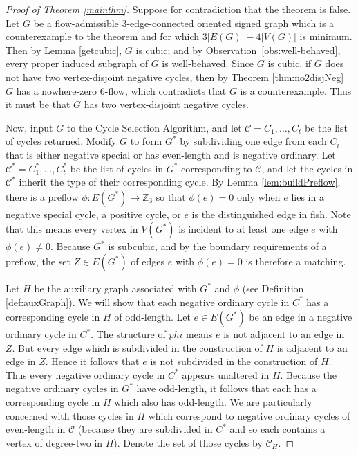 \documentclass[12pt]{article}
\begin{document}
\begin{proof}[Proof of Theorem \ref{mainthm}]
Suppose for contradiction that the theorem is false. Let $G$ be a flow-admissible 3-edge-connected oriented signed graph which is a counterexample to the theorem and for which $3|E(G)| - 4|V(G)|$ is minimum. Then by Lemma \ref{getcubic}, $G$ is cubic; and  
by Observation~\ref{obs:well-behaved}, every proper induced subgraph of $G$ is well-behaved. Since $G$ is cubic, if $G$ does not have two vertex-disjoint negative cycles, then by Theorem \ref{thm:no2disjNeg} $G$ has a nowhere-zero 6-flow, which contradicts that $G$ is a counterexample. Thus it must be that $G$ has two vertex-disjoint negative cycles. 

Now, input $G$ to the Cycle Selection Algorithm, and let $\mathcal{C} = C_1, \dots, C_t$ be the list of cycles returned.
Modify $G$ to form $G^*$ by subdividing one edge from each $C_i$ that is either negative special or has even-length and is negative ordinary. Let $\mathcal{C}^* = C_1^*, \ldots, C_t^*$ be the list of cycles in $G^*$ corresponding to $\mathcal{C}$, and let the cycles in $\mathcal{C}^*$ inherit the type of their corresponding cycle. By Lemma \ref{lem:buildPreflow}, there is a preflow $\phi : E(G^*) \rightarrow {\mathbb Z}_3$ so that $\phi(e) = 0$ only when $e$ lies in a negative special cycle, a positive cycle, or $e$ is the distinguished edge in fish. Note that this means every vertex in $V(G^*)$ is incident to at least one edge $e$ with $\phi(e) \neq 0$. Because $G^*$ is subcubic, and by the boundary requirements of a preflow, the set $Z \in E(G^*)$ of edges $e$ with $\phi(e) = 0$ is therefore a matching. 

Let $H$ be the auxiliary graph associated with $G^*$ and $\phi$ (see Definition \ref{def:auxGraph}). We will show that each negative ordinary cycle in $C^*$ has a corresponding cycle in $H$ of odd-length. Let $e \in E(G^*)$ be an edge in a negative ordinary cycle in $C^*$. The structure of $phi$ means $e$ is not adjacent to an edge in $Z$. But every edge which is subdivided in the construction of $H$ is adjacent to an edge in $Z$. Hence it follows that $e$ is not subdivided in the construction of $H$. Thus every negative ordinary cycle in $C^*$ appears unaltered in $H$. Because the negative ordinary cycles in $G^*$ have odd-length, it follows that each has a corresponding cycle in $H$ which also has odd-length. We are particularly concerned with those cycles in $H$ which correspond to negative ordinary cycles of even-length in $\mathcal{C}$ (because they are subdivided in $C^*$ and so each contains a vertex of degree-two in $H$). Denote the set of those cycles by $\mathcal{C}_H$.


\end{proof}
\end{document}
